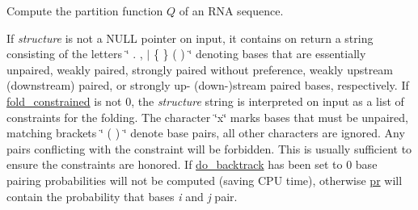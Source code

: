 Compute the partition function $Q$ of an R\+NA sequence. 

If {\itshape structure} is not a N\+U\+LL pointer on input, it contains on return a string consisting of the letters \char`\"{} . , $\vert$ \{ \} ( ) \char`\"{} denoting bases that are essentially unpaired, weakly paired, strongly paired without preference, weakly upstream (downstream) paired, or strongly up-\/ (down-\/)stream paired bases, respectively. If \hyperlink{fold__vars_8h_a0afc287c2464866d94858c39175154af}{fold\+\_\+constrained} is not 0, the {\itshape structure} string is interpreted on input as a list of constraints for the folding. The character \char`\"{}x\char`\"{} marks bases that must be unpaired, matching brackets \char`\"{} ( ) \char`\"{} denote base pairs, all other characters are ignored. Any pairs conflicting with the constraint will be forbidden. This is usually sufficient to ensure the constraints are honored. If \hyperlink{group__model__details_gad512b5dd4dbec60faccfe137bb474489}{do\+\_\+backtrack} has been set to 0 base pairing probabilities will not be computed (saving C\+PU time), otherwise \hyperlink{fold__vars_8h_ac98ec419070aee6831b44e5c700f090f}{pr} will contain the probability that bases {\itshape i} and {\itshape j} pair.

